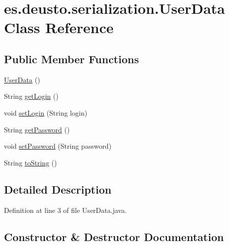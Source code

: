 \hypertarget{classes_1_1deusto_1_1serialization_1_1_user_data}{}\section{es.\+deusto.\+serialization.\+User\+Data Class Reference}
\label{classes_1_1deusto_1_1serialization_1_1_user_data}
\subsection*{Public Member Functions}
\begin{DoxyCompactItemize}
\item 
\mbox{\hyperlink{classes_1_1deusto_1_1serialization_1_1_user_data_a7bd940bf1869b9c6f8e7161e8ee38121}{User\+Data}} ()
\item 
String \mbox{\hyperlink{classes_1_1deusto_1_1serialization_1_1_user_data_a6cb9be263b3577d3adbefc8af9d4fae8}{get\+Login}} ()
\item 
void \mbox{\hyperlink{classes_1_1deusto_1_1serialization_1_1_user_data_a4a1de61a3a73d1d217be31c868f5674b}{set\+Login}} (String login)
\item 
String \mbox{\hyperlink{classes_1_1deusto_1_1serialization_1_1_user_data_abfa42147b4a2fe85f8c002a856069576}{get\+Password}} ()
\item 
void \mbox{\hyperlink{classes_1_1deusto_1_1serialization_1_1_user_data_a28efba1d140f0b371bfc777d1c825614}{set\+Password}} (String password)
\item 
String \mbox{\hyperlink{classes_1_1deusto_1_1serialization_1_1_user_data_ac2a905aeaf972596d8fd135d76c763cd}{to\+String}} ()
\end{DoxyCompactItemize}


\subsection{Detailed Description}


Definition at line 3 of file User\+Data.\+java.



\subsection{Constructor \& Destructor Documentation}
\mbox{\label{classes_1_1deusto_1_1serialization_1_1_user_data_a7bd940bf1869b9c6f8e7161e8ee38121}} 

